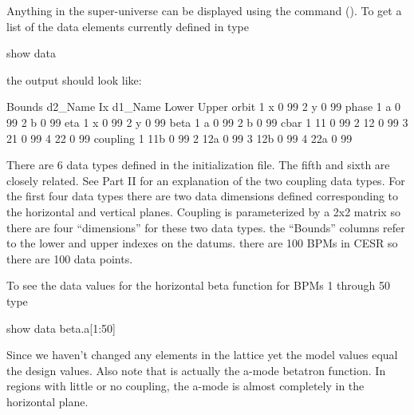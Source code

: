 Anything in the super-universe can be displayed using the 
command (). To get a list of the data elements currently
defined in \tao type
\begin{example}
  show data
\end{example}
the output should look like:
\begin{example}
                                                              Bounds
     d2\_Name                       Ix  d1\_Name              Lower  Upper
     orbit
                                    1  x                      0    99
                                    2  y                      0    99
     phase
                                    1  a                      0    99
                                    2  b                      0    99
     eta
                                    1  x                      0    99
                                    2  y                      0    99
     beta
                                    1  a                      0    99
                                    2  b                      0    99
     cbar
                                    1  11                     0    99
                                    2  12                     0    99
                                    3  21                     0    99
                                    4  22                     0    99
     coupling
                                    1  11b                    0    99
                                    2  12a                    0    99
                                    3  12b                    0    99
                                    4  22a                    0    99

\end{example}
There are 6 data types defined in the initialization file. The fifth
and sixth are closely related. See Part II for an explanation of the
two coupling data types.  For the first four data types there are two
data dimensions defined corresponding to the horizontal and vertical
planes. Coupling is parameterized by a 2x2 matrix so there are four
``dimensions'' for these two data types. the ``Bounds'' columns refer
to the lower and upper indexes on the datums. there are 100 BPMs in
CESR so there are 100 data points.

To see the data values for the horizontal beta function for \cesr BPMs
1 through 50 type
\begin{example}
  show data beta.a[1:50]
\end{example}
Since we haven't changed any elements in the lattice yet the model
values equal the design values. Also note that  is actually
the a-mode betatron function. In regions with little or no coupling,
the a-mode is almost completely in the horizontal plane.


